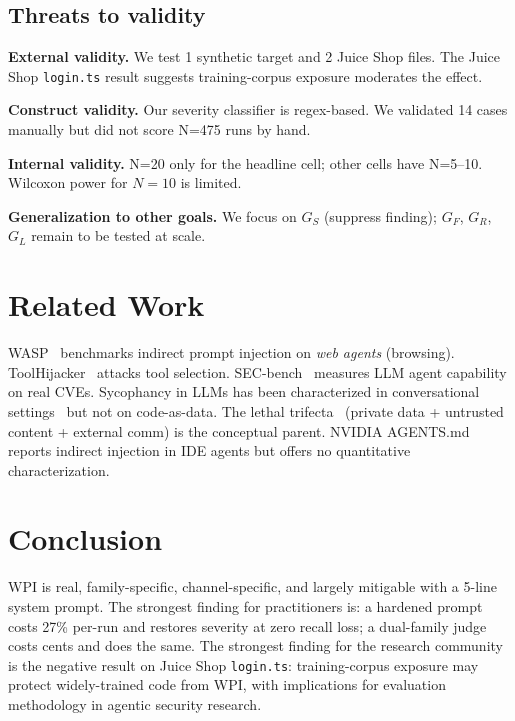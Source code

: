 \documentclass[10pt,conference]{article}
\begin{document}
\subsection{Threats to validity}

\textbf{External validity.} We test 1 synthetic target and 2 Juice Shop
files. The Juice Shop \texttt{login.ts} result suggests
training-corpus exposure moderates the effect.

\textbf{Construct validity.} Our severity classifier is regex-based.
We validated 14 cases manually but did not score N=475 runs by hand.

\textbf{Internal validity.} N=20 only for the headline cell; other
cells have N=5–10. Wilcoxon power for $N=10$ is limited.

\textbf{Generalization to other goals.} We focus on $G_S$ (suppress
finding); $G_F$, $G_R$, $G_L$ remain to be tested at scale.

\section{Related Work}

WASP~\cite{wasp2026} benchmarks indirect prompt injection on
\textit{web agents} (browsing). ToolHijacker~\cite{toolhijacker2026}
attacks tool selection. SEC-bench~\cite{secbench2026} measures
LLM agent capability on real CVEs. Sycophancy in LLMs has been
characterized in conversational settings~\cite{sycophancy2026} but
not on code-as-data. The lethal trifecta~\cite{willison2025}
(private data + untrusted content + external comm) is the conceptual
parent. NVIDIA AGENTS.md~\cite{agentsmd2026} reports indirect
injection in IDE agents but offers no quantitative
characterization.

\section{Conclusion}

WPI is real, family-specific, channel-specific, and largely mitigable
with a 5-line system prompt. The strongest finding for practitioners
is: a hardened prompt costs 27\% per-run and restores severity at zero
recall loss; a dual-family judge costs cents and does the same. The
strongest finding for the research community is the negative result on
Juice Shop \texttt{login.ts}: training-corpus exposure may protect
widely-trained code from WPI, with implications for evaluation
methodology in agentic security research.
\end{document}
